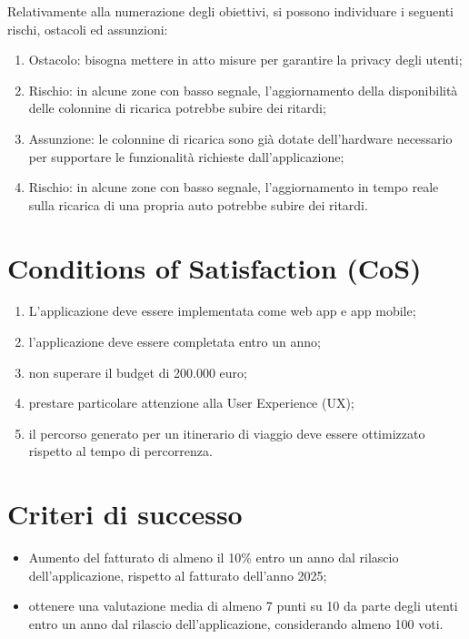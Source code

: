 \documentclass[a4paper,12pt]{article}
\begin{document}
Relativamente alla numerazione degli obiettivi, si possono individuare i seguenti rischi, ostacoli ed assunzioni:
\begin{enumerate}
    \item Ostacolo: bisogna mettere in atto misure per garantire la privacy degli utenti;
    \item Rischio: in alcune zone con basso segnale, l'aggiornamento della disponibilità delle colonnine di ricarica
    potrebbe subire dei ritardi;
    \item Assunzione: le colonnine di ricarica sono già dotate dell'hardware necessario per supportare le funzionalità
    richieste dall'applicazione;
    \item Rischio: in alcune zone con basso segnale, l'aggiornamento in tempo reale sulla ricarica di una propria auto
    potrebbe subire dei ritardi.
\end{enumerate}

\section{Conditions of Satisfaction (CoS)}
\begin{enumerate}
    \item L'applicazione deve essere implementata come web app e app mobile;
    \item l'applicazione deve essere completata entro un anno;
    \item non superare il budget di 200.000 euro;
    \item prestare particolare attenzione alla User Experience (UX);
    \item il percorso generato per un itinerario di viaggio deve essere ottimizzato rispetto al tempo di percorrenza.
\end{enumerate}

\section{Criteri di successo}
\begin{itemize}
    \item Aumento del fatturato di almeno il 10\% entro un anno dal rilascio dell'applicazione, rispetto al fatturato
    dell'anno 2025;
    \item ottenere una valutazione media di almeno 7 punti su 10 da parte degli utenti entro un anno dal rilascio
    dell'applicazione, considerando almeno 100 voti.
\end{itemize}
\end{document}
